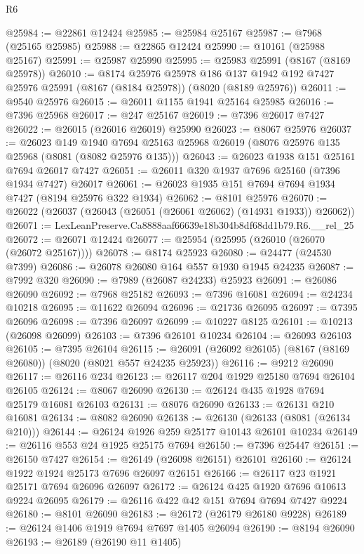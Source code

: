 \begin{lexlean}{R6}
\begin{coremodule}
@25984 := @22861 @12424
@25985 := @25984 @25167
@25987 := @7968 (@25165 @25985)
@25988 := @22865 @12424
@25990 := @10161 (@25988 @25167)
@25991 := @25987 @25990
@25995 := @25983 @25991 (@8167 (@8169 @25978))
@26010 := @8174
    @25976
    @25978
    @186
    @137
    @1942
    @192
    @7427
    @25976
    @25991
    (@8167 (@8184 @25978))
    (@8020 (@8189 @25976))
@26011 := @9540 @25976
@26015 := @26011 @1155 @1941 @25164 @25985
@26016 := @7396 @25968
@26017 := @247 @25167
@26019 := @7396 @26017 @7427
@26022 := @26015 (@26016 @26019) @25990
@26023 := @8067 @25976
@26037 := @26023
    @149
    @1940
    @7694
    @25163
    @25968
    @26019
    (@8076 @25976 @135 @25968 (@8081 (@8082 @25976 @135)))
@26043 := @26023 @1938 @151 @25161 @7694 @26017 @7427
@26051 := @26011 @320 @1937 @7696 @25160 (@7396 @1934 @7427) @26017
@26061 := @26023 @1935 @151 @7694 @7694 @1934 @7427 (@8194 @25976 @322 @1934)
@26062 := @8101 @25976
@26070 := @26022 (@26037 (@26043 (@26051 (@26061 @26062) (@14931 @1933)) @26062))
@26071 := LexLeanPreserve.Ca8888aaf66639e18b304b8df68dd1b79.R6.__rel_25
@26072 := @26071 @12424
@26077 := @25954 (@25995 (@26010 (@26070 (@26072 @25167))))
@26078 := @8174 @25923
@26080 := @24477 (@24530 @7399)
@26086 := @26078 @26080 @164 @557 @1930 @1945 @24235
@26087 := @7992 @320
@26090 := @7989 (@26087 @24233) @25923
@26091 := @26086 @26090
@26092 := @7968 @25182
@26093 := @7396 @16081
@26094 := @24234 @10218
@26095 := @11622 @26094
@26096 := @21736 @26095
@26097 := @7395 @26096
@26098 := @7396 @26097
@26099 := @10227 @8125
@26101 := @10213 (@26098 @26099)
@26103 := @7396 @26101 @10234
@26104 := @26093 @26103
@26105 := @7395 @26104
@26115 := @26091 (@26092 @26105) (@8167 (@8169 @26080)) (@8020 (@8021 @557 @24235 @25923))
@26116 := @9212 @26090
@26117 := @26116 @234
@26123 := @26117 @204 @1929 @25180 @7694 @26104 @26105
@26124 := @8067 @26090
@26130 := @26124 @435 @1928 @7694 @25179 @16081 @26103
@26131 := @8076 @26090
@26133 := @26131 @210 @16081
@26134 := @8082 @26090
@26138 := @26130 (@26133 (@8081 (@26134 @210)))
@26144 := @26124 @1926 @259 @25177 @10143 @26101 @10234
@26149 := @26116 @553 @24 @1925 @25175 @7694
@26150 := @7396 @25447
@26151 := @26150 @7427
@26154 := @26149 (@26098 @26151) @26101
@26160 := @26124 @1922 @1924 @25173 @7696 @26097 @26151
@26166 := @26117 @23 @1921 @25171 @7694 @26096 @26097
@26172 := @26124 @425 @1920 @7696 @10613 @9224 @26095
@26179 := @26116 @422 @42 @151 @7694 @7694 @7427 @9224
@26180 := @8101 @26090
@26183 := @26172 (@26179 @26180 @9228)
@26189 := @26124 @1406 @1919 @7694 @7697 @1405 @26094
@26190 := @8194 @26090
@26193 := @26189 (@26190 @11 @1405)

\end{coremodule}
\end{lexlean}
